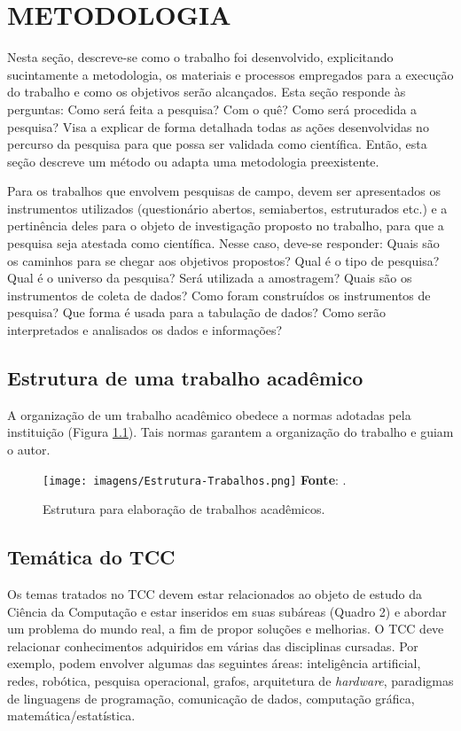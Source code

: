 \chapter{METODOLOGIA}\label{chp:METODOLOGIA}

Nesta seção, descreve-se como o trabalho foi desenvolvido, explicitando sucintamente a metodologia, os materiais e processos empregados para a execução do trabalho e como os objetivos serão alcançados. Esta seção responde às perguntas: Como será feita a pesquisa? Com o quê? Como será procedida a pesquisa? Visa a explicar de forma detalhada todas as ações desenvolvidas no percurso da pesquisa para que possa ser validada como científica. Então, esta seção descreve um método ou adapta uma metodologia preexistente. 

Para os trabalhos que envolvem pesquisas de campo, devem ser apresentados os instrumentos utilizados (questionário abertos, semiabertos, estruturados etc.) e a pertinência deles para o objeto de investigação proposto no trabalho, para que a pesquisa seja atestada como científica. Nesse caso, deve-se responder: Quais são os caminhos para se chegar aos objetivos propostos? Qual é o tipo de pesquisa? Qual é o universo da pesquisa? Será utilizada a amostragem? Quais são os instrumentos de coleta de dados?  Como foram construídos os instrumentos de pesquisa? Que forma é usada para a tabulação de dados? Como serão interpretados e analisados os dados e informações? 

 \section{Estrutura de uma trabalho acadêmico}\label{sec:ESTRUTURATRAB}
A organização de um trabalho acadêmico obedece a normas adotadas pela instituição (Figura \ref{fig:EstruturaTrab}). Tais normas garantem a organização do trabalho e guiam o autor.

\begin{figure}[htb]
	\centering
	\caption{Estrutura para elaboração de trabalhos acadêmicos.}
	\texttt{[image: imagens/Estrutura-Trabalhos.png]} 
	\newline \footnotesize \textbf{Fonte}: \cite{webLink}.
	\label{fig:EstruturaTrab}
\end{figure}

\section{Temática do TCC}\label{sec:TEMÁTICATCC}
Os temas tratados no TCC devem estar relacionados ao objeto de estudo da Ciência da Computação e estar inseridos em suas subáreas (Quadro 2) e abordar um problema do mundo real, a fim de propor soluções e melhorias. O TCC deve relacionar conhecimentos adquiridos em várias das disciplinas cursadas. Por exemplo, podem envolver algumas das seguintes áreas: inteligência artificial, redes, robótica, pesquisa operacional, grafos, arquitetura de \textit{hardware}, paradigmas de linguagens de programação, comunicação de dados, computação gráfica, matemática/estatística.  

